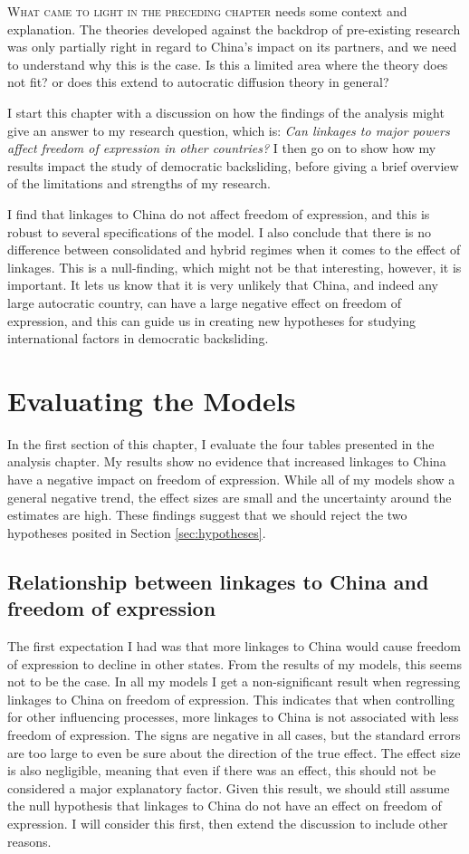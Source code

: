 \lettrine{W}{hat came to light in the preceding chapter} needs some context and explanation. The theories developed against the backdrop of pre-existing research was only partially right in regard to China's impact on its partners, and we need to understand why this is the case. Is this a limited area where the theory does not fit? or does this extend to autocratic diffusion theory in general?

I start this chapter with a discussion on how the findings of the analysis might give an answer to my research question, which is: \textit{Can linkages to major powers affect freedom of expression in other countries?} I then go on to show how my results impact the study of democratic backsliding, before giving a brief overview of the limitations and strengths of my research. 

I find that linkages to China do not affect freedom of expression, and this is robust to several specifications of the model. I also conclude that there is no difference between consolidated and hybrid regimes when it comes to the effect of linkages. This is a null-finding, which might not be that interesting, however, it is important. It lets us know that it is very unlikely that China, and indeed any large autocratic country, can have a large negative effect on freedom of expression, and this can guide us in creating new hypotheses for studying international factors in democratic backsliding. 

\section{Evaluating the Models}
In the first section of this chapter, I evaluate the four tables presented in the analysis chapter. My results show no evidence that increased linkages to China have a negative impact on freedom of expression. While all of my models show a general negative trend, the effect sizes are small and the uncertainty around the estimates are high. These findings suggest that we should reject the two hypotheses posited in Section \ref{sec:hypotheses}.

\subsection{Relationship between linkages to China and freedom of expression}
The first expectation I had was that more linkages to China would cause freedom of expression to decline in other states. From the results of my models, this seems not to be the case. In all my models  I get a non-significant result when regressing linkages to China on freedom of expression. This indicates that when controlling for other influencing processes, more linkages to China is not associated with less freedom of expression. The signs are negative in all cases, but the standard errors are too large to even be sure about the direction of the true effect. The effect size is also negligible, meaning that even if there was an effect, this should not be considered a major explanatory factor. Given this result, we should still assume the null hypothesis that linkages to China do not have an effect on freedom of expression. I will consider this first, then extend the discussion to include other reasons. 

